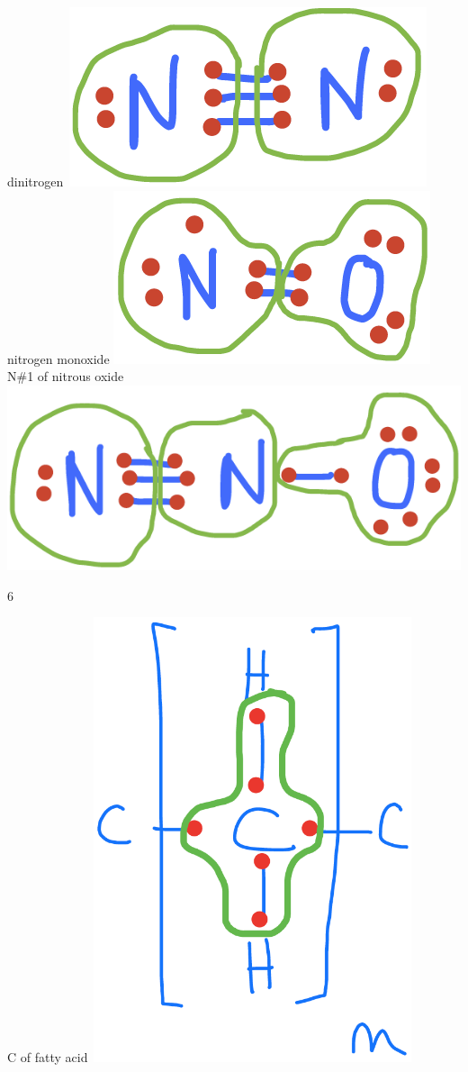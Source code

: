 \documentclass[]{book}
\theoremstyle{definition}
\theoremstyle{definition}
\theoremstyle{definition}
\theoremstyle{remark}
\begin{document}
dinitrogen~\includegraphics{pictures/ElecAlloc_N2.png} nitrogen monoxide
\includegraphics{pictures/ElecAlloc_NO.png} N\#1 of nitrous oxide
\includegraphics{pictures/ElecAlloc_N2O.png}

6

C of fatty
acid~\includegraphics[width=0.70000\textwidth]{pictures/ElecAlloc_fatty_acid.png}
\end{document}
